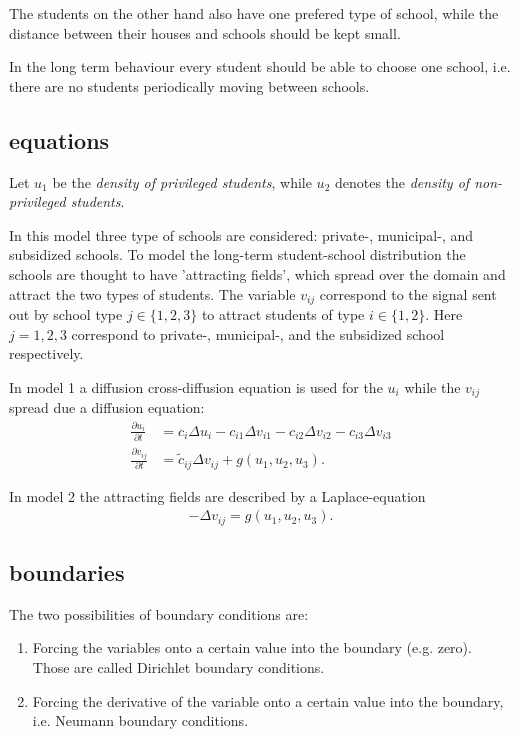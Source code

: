 \documentclass[12pt,a4paper]{article}
\newcommand{\ita}[1]{\textit{#1}}
\begin{document}
The students on the other hand also have one prefered type of school, while the distance between their houses and schools should be kept small.

In the long term behaviour every student should be able to choose one school, i.e. there are no students periodically moving between schools. 







\subsection{equations}
Let $u_{1}$ be the \ita{density of privileged students}, while $u_{2}$ denotes the \ita{density of non-privileged students}. 

In this model three type of schools are considered: private-, municipal-, and subsidized schools. To model the long-term student-school distribution the schools are thought to have 'attracting fields', which spread over the domain and attract the two types of students. The variable $v_{ij}$ correspond to the signal sent out by school type $j \in \{1,2,3\}$ to attract students of type $i \in \{1,2\}$. Here $j=1,2,3$ correspond to private-, municipal-, and the subsidized school respectively. 

In model 1 a diffusion cross-diffusion equation is used for the $u_{i}$ while the $v_{ij}$ spread due a diffusion equation:
\begin{align}
\frac{\partial u_{i}}{\partial t} &= c_{i} \Delta u_{i} - c_{i1} \Delta v_{i1} - c_{i2} \Delta v_{i2} - c_{i3} \Delta v_{i3} \label{eq:model_1_1} \\
\frac{\partial v_{ij}}{\partial t} &= \tilde{c}_{ij} \Delta v_{ij} + g \left(u_{1},u_{2},u_{3} \right). \label{eq:model_1_2}
\end{align}

In model 2 the attracting fields are described by a Laplace-equation
\begin{align}
- \Delta v_{ij} = g \left(u_{1},u_{2},u_{3} \right). \label{eq:model_2_1}
\end{align}

\subsection{boundaries}
The two possibilities of boundary conditions are:
\begin{enumerate}
\item Forcing the variables onto a certain value into the boundary (e.g. zero). Those are called Dirichlet boundary conditions.
\item Forcing the derivative of the variable onto a certain value into the boundary, i.e. Neumann boundary conditions.
\end{enumerate}
\end{document}
